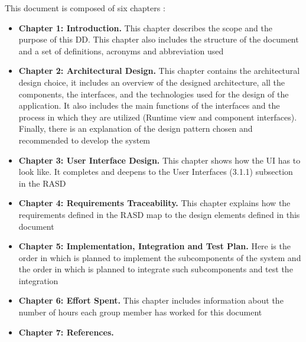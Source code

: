 This document is composed of six chapters :
\begin{itemize}
    \item \textbf{Chapter 1: Introduction.} This chapter describes the scope and the purpose of this DD. This chapter also includes the structure of the document and a set of definitions, acronyms and abbreviation used
    \item \textbf{Chapter 2: Architectural Design.} This chapter contains the architectural design choice, it includes an overview of the designed architecture, all the components, the interfaces, and the technologies used for the design of the application. It also includes the main functions of the interfaces and the process in which they are utilized (Runtime view and component interfaces). Finally, there is an explanation of the design pattern chosen and recommended to develop the system
    \item \textbf{Chapter 3: User Interface Design.} This chapter shows how the UI has to look like. It completes and deepens to the User Interfaces (3.1.1) subsection in the RASD
    \item \textbf{Chapter 4: Requirements Traceability.} This chapter explains how the requirements defined in the RASD map to the design elements defined in this document
    \item \textbf{Chapter 5: Implementation, Integration and Test Plan.} Here is the order in which is planned to implement the subcomponents of the system and the order in which is planned to integrate such subcomponents and test the integration
    \item \textbf{Chapter 6: Effort Spent.}  This chapter includes information about the number of hours each group member has worked for this document
    \item \textbf{Chapter 7: References.}
\end{itemize}